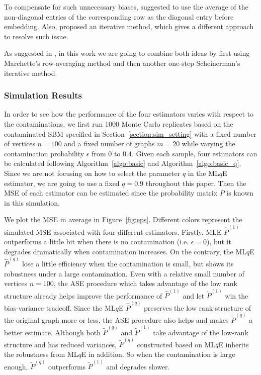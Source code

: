 \documentclass[a4paper]{article}
\renewcommand{\hat}{\widehat}
\begin{document}
To compensate for such unnecessary biases, \citet{marchette2011vertex} suggested to use the average of the non-diagonal entries of the corresponding row as the diagonal entry before embedding. Also, \citet{scheinerman2010modeling} proposed an iterative method, which gives a different approach to resolve such issue.

As suggested in \citep{tang2016law}, in this work we are going to combine both ideas by first using Marchette's row-averaging method and then another one-step Scheinerman's iterative method.

\subsubsection{Simulation Results}

In order to see how the performance of the four estimators varies with respect to the contaminations, we first run 1000 Monte Carlo replicates based on the contaminated SBM specified in Section~\ref{section:sim_setting} with a fixed number of vertices $n = 100$ and a fixed number of graphs $m = 20$ while varying the contamination probability $\epsilon$ from $0$ to $0.4$.
Given each sample, four estimators can be calculated following Algorithm~\ref{algo:basic} and Algorithm~\ref{algo:basic_q}. Since we are not focusing on how to select the parameter $q$ in the ML$q$E estimator, we are going to use a fixed $q = 0.9$ throughout this paper. Then the MSE of each estimator can be estimated since the probability matrix $P$ is known in this simulation.

We plot the MSE in average in Figure~\ref{fig:eps}. Different colors represent the simulated MSE associated with four different estimators.
Firstly, MLE $\hat{P}^{(1)}$ outperforms a little bit when there is no contamination (i.e. $\epsilon = 0$), but it degrades dramatically when contamination increases. On the contrary, the ML$q$E $\hat{P}^{(q)}$ lose a little efficiency when the contamination is small, but shows its robustness under a large contamination.
Even with a relative small number of vertices $n = 100$, the ASE procedure which takes advantage of the low rank structure already helps improve the performance of $\hat{P}^{(1)}$ and let $\widetilde{P}^{(1)}$ win the bias-variance tradeoff. Since the ML$q$E $\hat{P}^{(q)}$ preserves the low rank structure of the original graph more or less, the ASE procedure also helps and makes $\widetilde{P}^{(q)}$ a better estimate. Although both $\widetilde{P}^{(q)}$ and $\widetilde{P}^{(1)}$ take advantage of the low-rank structure and has reduced variances, $\widetilde{P}^{(q)}$ constructed based on ML$q$E inherits the robustness from ML$q$E in addition. So when the contamination is large enough, $\widetilde{P}^{(q)}$ outperforms $\widetilde{P}^{(1)}$ and degrades slower.
\end{document}
